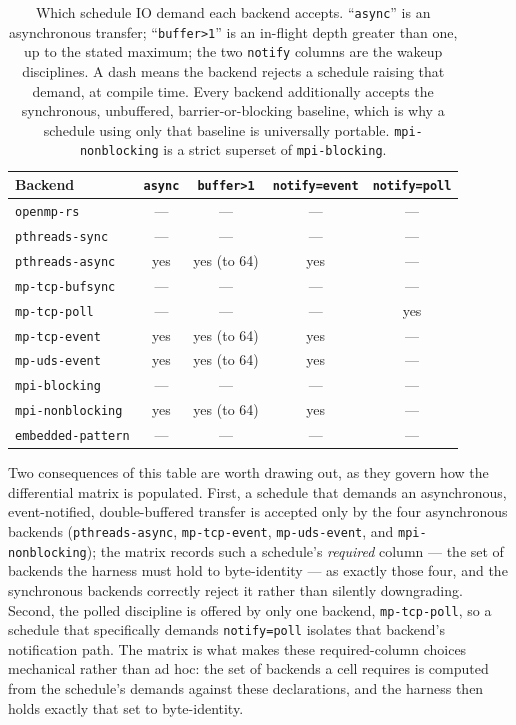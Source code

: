 \begin{table}[htbp]
  \centering
  \small
  \begin{tabular}{@{}lcccc@{}}
    \toprule
    Backend & \texttt{async} & \texttt{buffer>1} & \texttt{notify=event} & \texttt{notify=poll} \\
    \midrule
    \texttt{openmp-rs}       & --- & --- & --- & --- \\
    \texttt{pthreads-sync}   & --- & --- & --- & --- \\
    \texttt{pthreads-async}  & yes & yes (to 64) & yes & --- \\
    \texttt{mp-tcp-bufsync}  & --- & --- & --- & --- \\
    \texttt{mp-tcp-poll}     & --- & --- & --- & yes \\
    \texttt{mp-tcp-event}    & yes & yes (to 64) & yes & --- \\
    \texttt{mp-uds-event}    & yes & yes (to 64) & yes & --- \\
    \texttt{mpi-blocking}    & --- & --- & --- & --- \\
    \texttt{mpi-nonblocking} & yes & yes (to 64) & yes & --- \\
    \texttt{embedded-pattern}& --- & --- & --- & --- \\
    \bottomrule
  \end{tabular}
  \caption{Which schedule IO demand each backend accepts. ``\texttt{async}'' is an
  asynchronous transfer; ``\texttt{buffer>1}'' is an in-flight depth greater than
  one, up to the stated maximum; the two \texttt{notify} columns are the wakeup
  disciplines. A dash means the backend rejects a schedule raising that demand, at
  compile time. Every backend additionally accepts the synchronous, unbuffered,
  barrier-or-blocking baseline, which is why a schedule using only that baseline is
  universally portable. \texttt{mpi-nonblocking} is a strict superset of
  \texttt{mpi-blocking}.}
  \label{tab:cap-demands}
\end{table}

Two consequences of this table are worth drawing out, as they govern how the
differential matrix is populated. First, a schedule that demands an asynchronous,
event-notified, double-buffered transfer is accepted only by the four asynchronous
backends (\texttt{pthreads-async}, \texttt{mp-tcp-event}, \texttt{mp-uds-event},
and \texttt{mpi-nonblocking}); the matrix records such a schedule's \emph{required}
column --- the set of backends the harness must hold to byte-identity --- as exactly
those four, and the synchronous backends correctly reject it rather than silently
downgrading. Second, the polled discipline is offered by only one
backend, \texttt{mp-tcp-poll}, so a schedule that specifically demands
\texttt{notify=poll} isolates that backend's notification path. The matrix is what
makes these required-column choices mechanical rather than ad hoc: the set of
backends a cell requires is computed from the schedule's demands against these
declarations, and the harness then holds exactly that set to byte-identity.
